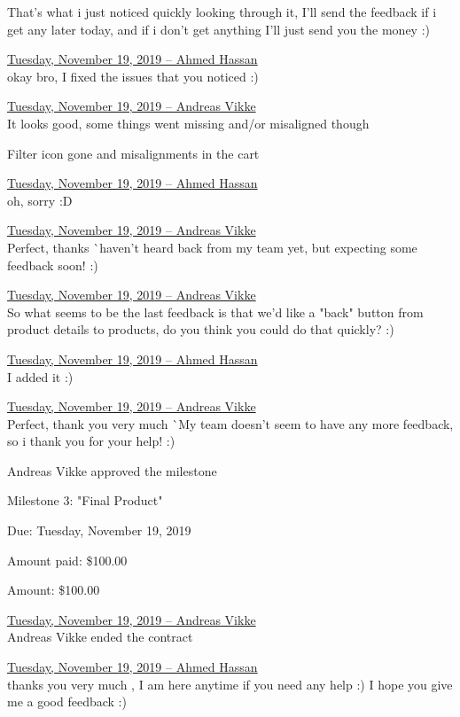 \documentclass[11pt]{report}
\begin{document}
\noindent That's what i just noticed quickly looking through it, I'll send the feedback if i get any later today, and if i don't get anything I'll just send you the money :)

\noindent\underline{Tuesday, November 19, 2019 – Ahmed Hassan}\\
\noindent okay bro, I fixed the issues that you noticed :)

\noindent\underline{Tuesday, November 19, 2019 – Andreas Vikke}\\
\noindent It looks good, some things went missing and/or misaligned though

\noindent Filter icon gone and misalignments in the cart

\noindent\underline{Tuesday, November 19, 2019 – Ahmed Hassan}\\
\noindent oh, sorry :D

\noindent\underline{Tuesday, November 19, 2019 – Andreas Vikke}\\
\noindent Perfect, thanks ^^ haven't heard back from my team yet, but expecting some feedback soon! :)

\noindent\underline{Tuesday, November 19, 2019 – Andreas Vikke}\\
\noindent So what seems to be the last feedback is that we'd like a "back" button from product details to products, do you think you could do that quickly? :)

\noindent\underline{Tuesday, November 19, 2019 – Ahmed Hassan}\\
\noindent I added it :)

\noindent\underline{Tuesday, November 19, 2019 – Andreas Vikke}\\
\noindent Perfect, thank you very much ^^ My team doesn't seem to have any more feedback, so i thank you for your help! :)

\noindent Andreas Vikke approved the milestone

Milestone 3: "Final Product"

Due: Tuesday, November 19, 2019

Amount paid: \$100.00

Amount: \$100.00

\noindent\underline{Tuesday, November 19, 2019 – Andreas Vikke}\\
\noindent Andreas Vikke ended the contract

\noindent\underline{Tuesday, November 19, 2019 – Ahmed Hassan}\\
\noindent thanks you very much , I am here anytime if you need any help :) I hope you give me a good feedback :)
\end{document}
